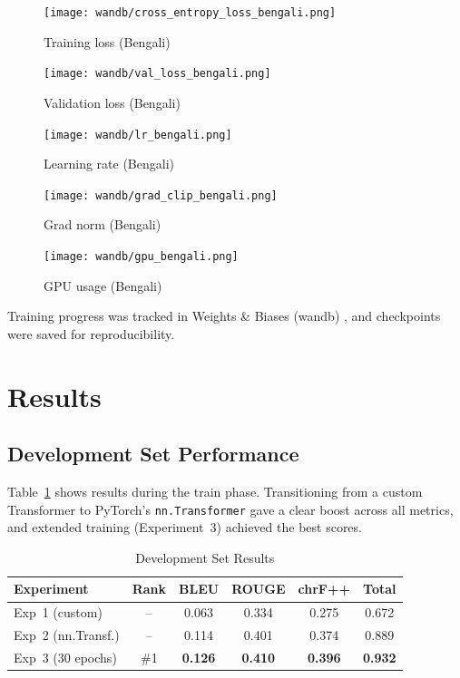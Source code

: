 \documentclass[11pt, oneside]{article}   	%
\begin{document}
\begin{figure}[h]
\centering
\begin{minipage}{0.18\textwidth}
    \centering
    \texttt{[image: wandb/cross\_entropy\_loss\_bengali.png]}
    \caption{Training loss (Bengali)}
    \label{fig:loss_bengali}
\end{minipage}
\hfill
\begin{minipage}{0.18\textwidth}
    \centering
    \texttt{[image: wandb/val\_loss\_bengali.png]}
    \caption{Validation loss (Bengali)}
    \label{fig:val_loss_bengali}
\end{minipage}
\hfill
\begin{minipage}{0.18\textwidth}
    \centering
    \texttt{[image: wandb/lr\_bengali.png]}
    \caption{Learning rate (Bengali)}
    \label{fig:lr_bengali}
\end{minipage}
\hfill
\begin{minipage}{0.18\textwidth}
    \centering
    \texttt{[image: wandb/grad\_clip\_bengali.png]}
    \caption{Grad norm (Bengali)}
    \label{fig:grad_bengali}
\end{minipage}
\hfill
\begin{minipage}{0.18\textwidth}
    \centering
    \texttt{[image: wandb/gpu\_bengali.png]}
    \caption{GPU usage (Bengali)}
    \label{fig:gpu_bengali}
\end{minipage}
\end{figure}


Training progress was tracked in Weights \& Biases (wandb) \cite{wandb}, and checkpoints were saved for reproducibility.


\section{Results}

\subsection{Development Set Performance}
Table~\ref{tab:dev_results} shows results during the train phase. Transitioning from a custom Transformer to PyTorch’s \texttt{nn.Transformer} gave a clear boost across all metrics, and extended training (Experiment~3) achieved the best scores.

\begin{table}[h]
\centering
\caption{Development Set Results}
\label{tab:dev_results}
\begin{tabular}{|l|c|c|c|c|c|}
\hline
\textbf{Experiment} & \textbf{Rank} & \textbf{BLEU} & \textbf{ROUGE} & \textbf{chrF++} & \textbf{Total} \\
\hline
Exp~1 (custom)  & -- & 0.063 & 0.334 & 0.275 & 0.672 \\
Exp~2 (nn.Transf.) & -- & 0.114 & 0.401 & 0.374 & 0.889 \\
Exp~3 (30 epochs) & \#1 & \textbf{0.126} & \textbf{0.410} & \textbf{0.396} & \textbf{0.932} \\
\hline
\end{tabular}
\end{table}
\end{document}
